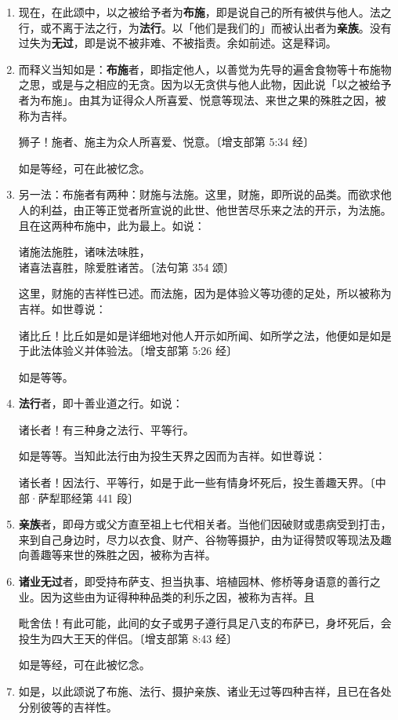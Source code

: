 \begin{enumerate}\item 现在，在此颂中，以之被给予者为\textbf{布施}，即是说自己的所有被供与他人。法之行，或不离于法之行，为\textbf{法行}。以「他们是我们的」而被认出者为\textbf{亲族}。没有过失为\textbf{无过}，即是说不被非难、不被指责。余如前述。这是释词。
\item 而释义当知如是：\textbf{布施}者，即指定他人，以善觉为先导的遍舍食物等十布施物之思，或是与之相应的无贪。因为以无贪供与他人此物，因此说「以之被给予者为布施」。由其为证得众人所喜爱、悦意等现法、来世之果的殊胜之因，被称为吉祥。\begin{quoting}狮子！施者、施主为众人所喜爱、悦意。{\bluefootnotesize 〔增支部第 5:34 经〕}\end{quoting}如是等经，可在此被忆念。
\item 另一法：布施者有两种：财施与法施。这里，财施，即所说的品类。而欲求他人的利益，由正等正觉者所宣说的此世、他世苦尽乐来之法的开示，为法施。且在这两种布施中，此为最上。如说：\begin{quoting}诸施法施胜，诸味法味胜，\\诸喜法喜胜，除爱胜诸苦。{\bluefootnotesize 〔法句第 354 颂〕}\end{quoting}这里，财施的吉祥性已述。而法施，因为是体验义等功德的足处，所以被称为吉祥。如世尊说：\begin{quoting}诸比丘！比丘如是如是详细地对他人开示如所闻、如所学之法，他便如是如是于此法体验义并体验法。{\bluefootnotesize 〔增支部第 5:26 经〕}\end{quoting}如是等等。
\item \textbf{法行}者，即十善业道之行。如说：\begin{quoting}诸长者！有三种身之法行、平等行。\end{quoting}如是等等。当知此法行由为投生天界之因而为吉祥。如世尊说：\begin{quoting}诸长者！因法行、平等行，如是于此一些有情身坏死后，投生善趣天界。{\bluefootnotesize 〔中部·萨犁耶经第 441 段〕}\end{quoting}
\item \textbf{亲族}者，即母方或父方直至祖上七代相关者。当他们因破财或患病受到打击，来到自己身边时，尽力以衣食、财产、谷物等摄护，由为证得赞叹等现法及趣向善趣等来世的殊胜之因，被称为吉祥。
\item \textbf{诸业无过}者，即受持布萨支、担当执事、培植园林、修桥等身语意的善行之业。因为这些由为证得种种品类的利乐之因，被称为吉祥。且\begin{quoting}毗舍佉！有此可能，此间的女子或男子遵行具足八支的布萨已，身坏死后，会投生为四大王天的伴侣。{\bluefootnotesize 〔增支部第 8:43 经〕}\end{quoting}如是等经，可在此被忆念。
\item 如是，以此颂说了布施、法行、摄护亲族、诸业无过等四种吉祥，且已在各处分别彼等的吉祥性。\end{enumerate}

